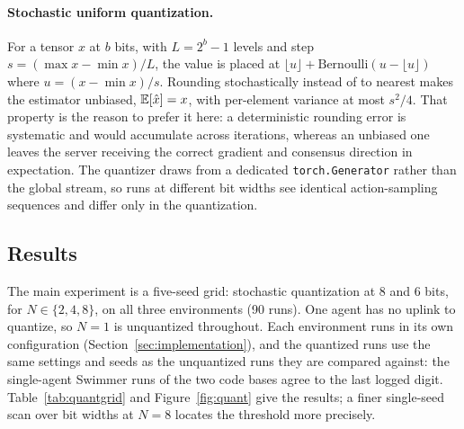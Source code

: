\paragraph{Stochastic uniform quantization.} For a tensor $x$ at $b$ bits, with
$L = 2^b - 1$ levels and step $s = (\max x - \min x)/L$, the value is placed at
$\lfloor u \rfloor + \mathrm{Bernoulli}(u - \lfloor u \rfloor)$ where
$u = (x - \min x)/s$. Rounding stochastically instead of to nearest makes the
estimator unbiased, $\mathbb{E}[\hat{x}] = x$, with per-element variance at most
$s^2/4$. That property is the reason to prefer it here: a deterministic
rounding error is systematic and would accumulate across iterations, whereas an
unbiased one leaves the server receiving the correct gradient and consensus
direction in expectation. The quantizer draws from a dedicated
\texttt{torch.Generator} rather than the global stream, so runs at different
bit widths see identical action-sampling sequences and differ only in the
quantization.

\subsection{Results}

The main experiment is a five-seed grid: stochastic quantization at 8 and 6
bits, for $N \in \{2,4,8\}$, on all three environments (90 runs). One agent has
no uplink to quantize, so $N=1$ is unquantized throughout. Each environment
runs in its own configuration (Section~\ref{sec:implementation}), and the
quantized runs use the same settings and seeds as the unquantized runs they
are compared against: the single-agent Swimmer runs of the two code bases agree to the last
logged digit. Table~\ref{tab:quantgrid} and Figure~\ref{fig:quant} give the
results; a finer single-seed scan over bit widths at $N=8$ locates the
threshold more precisely.


